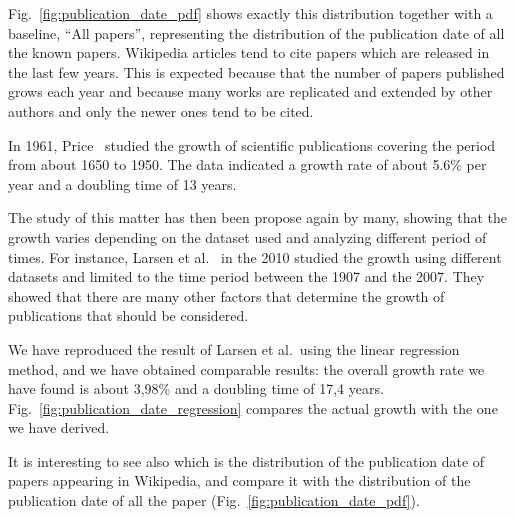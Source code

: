 Fig.~\ref{fig:publication_date_pdf} shows exactly this distribution together with a baseline, ``All papers'', representing the distribution of the publication date of all the known papers.
Wikipedia articles tend to cite papers which are released in the last few years.
This is expected because that the number of papers published grows each year and because many works are replicated and extended by other authors and only the newer ones tend to be cited.


In 1961, Price~\cite{Price1961} studied the growth of scientific publications covering the period from about 1650 to 1950.
The data indicated a growth rate of about 5.6\% per year and a doubling time of 13 years.

The study of this matter has then been propose again by many, showing that the growth varies depending on the dataset used and analyzing different period of times.
For instance, Larsen et al.~\cite{Larsen2010} in the 2010 studied the growth using different datasets and limited to the time period between the 1907 and the 2007.
They showed that there are many other factors that determine the growth of publications that should be considered.

We have reproduced the result of Larsen et al.\ using the linear regression method, and we have obtained comparable results: the overall growth rate we have found is about 3,98\% and a doubling time of 17,4 years.
Fig.~\ref{fig:publication_date_regression} compares the actual growth with the one we have derived.

It is interesting to see also which is the distribution of the publication date of papers appearing in Wikipedia, and compare it with the distribution of the publication date of all the paper (Fig.~\ref{fig:publication_date_pdf}).

